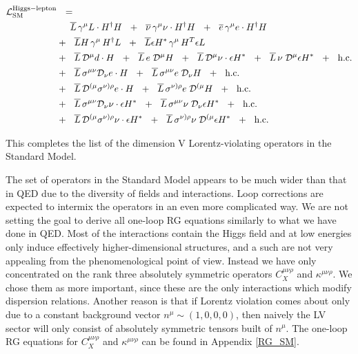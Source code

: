 \documentclass[12pt]{revtex4}
\newcommand{\ov}{\overline}
\newcommand{\md}{\mathcal{D}}
\begin{document}
\begin{align}
\notag
	\mathcal{L}_{\rm SM}^{\rm Higgs-lepton} & ~~=~~
	\\
\notag
	&
	\phantom{+~~}
	\ov{L}\, \gamma^\mu L \cdot H^\dag H ~~+~~
	\ov{\nu}\, \gamma^\mu \nu \cdot H^\dag H ~~+~~
	\ov{e}\, \gamma^\mu e \cdot H^\dag H 
	\\
\notag
	&
	+~~
	\ov{L}H \, \gamma^\mu\, H^\dag L ~~+~~
	\ov{L}\epsilon H^* \, \gamma^\mu \, H^T \epsilon L 
	\\
\notag
	&
	+~~
	\ov{L}\, \md^\mu d\cdot H ~~+~~
	\ov{L}\, e \; \md^\mu H ~~+~~
	\ov{L}\, \md^\mu \nu \cdot \epsilon H^* ~~+~~
	\ov{L}\, \nu \; \md^\mu \epsilon H^* ~~+~~
	\text{h.c.}
	\\
\notag
	&
	+~~
	\ov{L}\, \sigma^{\mu\nu} \md_\nu e \cdot H ~~+~~
	\ov{L}\, \sigma^{\mu\nu} e\; \md_\nu H ~~+~~
	\text{h.c.}
	\\
\notag
	&
	+~~
	\ov{L}\, \md^{(\mu} \sigma^{\nu)\rho} e \cdot H ~~+~~
	\ov{L}\, \sigma^{\nu)\rho} e \; \md^{(\mu} H ~~+~~
	\text{h.c.}
	\\
\notag
	&
	+~~
	\ov{L}\, \sigma^{\mu\nu} \md_\nu \nu \cdot \epsilon H^* ~~+~~
	\ov{L}\, \sigma^{\mu\nu} \nu\; \md_\nu \epsilon H^* ~~+~~
	\text{h.c.}
	\\
\notag
	&
	+~~
	\ov{L}\, \md^{(\mu} \sigma^{\nu)\rho} \nu \cdot \epsilon H^* ~~+~~
	\ov{L}\, \sigma^{\nu)\rho} \nu \; \md^{(\mu} \epsilon H^* ~~+~~
	\text{h.c.}
\end{align}

	This completes the list of the dimension V Lorentz-violating
	operators in the Standard Model.

	The set of operators in the Standard Model appears to be much
	wider than that in QED due to the diversity of fields and interactions.
	Loop corrections are expected to intermix the operators in an 
	even more complicated way.
	We are not setting the goal to derive all one-loop RG
	equations similarly to what we have done in QED.
	Most of the interactions contain the Higgs field and at low
	energies only induce effectively higher-dimensional structures,
	and a such are not very appealing from the phenomenological point of
	view.
	Instead we have only concentrated on the rank three absolutely
	symmetric operators $ C_X^{\mu\nu\rho} $ 
	and $ \kappa^{\mu\nu\rho} $.
	We chose them as more important, since these are the only interactions
	which modify dispersion relations.
	Another reason is that if Lorentz violation comes about only 
	due to a constant background vector $ n^{\mu} \sim (1, 0, 0, 0) $,
	then naively the LV sector will only consist of absolutely symmetric
	tensors built of $ n^\mu $.
	The one-loop RG equations for $ C_X^{\mu\nu\rho} $ 
	and $ \kappa^{\mu\nu\rho} $ can be found in Appendix \ref{RG_SM}.
\end{document}
